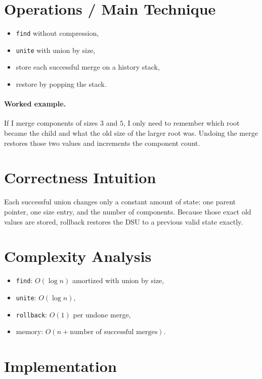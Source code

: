 \section*{Operations / Main Technique}

\begin{itemize}
  \item \texttt{find} without compression,
  \item \texttt{unite} with union by size,
  \item store each successful merge on a history stack,
  \item restore by popping the stack.
\end{itemize}

\paragraph{Worked example.}
If I merge components of sizes \(3\) and \(5\), I only need to remember which root became the child and what the old
size of the larger root was. Undoing the merge restores those two values and increments the component count.

\section*{Correctness Intuition}

Each successful union changes only a constant amount of state: one parent pointer, one size entry, and the number of
components. Because those exact old values are stored, rollback restores the DSU to a previous valid state exactly.

\section*{Complexity Analysis}

\begin{itemize}
  \item \texttt{find}: \(O(\log n)\) amortized with union by size,
  \item \texttt{unite}: \(O(\log n)\),
  \item \texttt{rollback}: \(O(1)\) per undone merge,
  \item memory: \(O(n + \text{number of successful merges})\).
\end{itemize}

\section*{Implementation}

